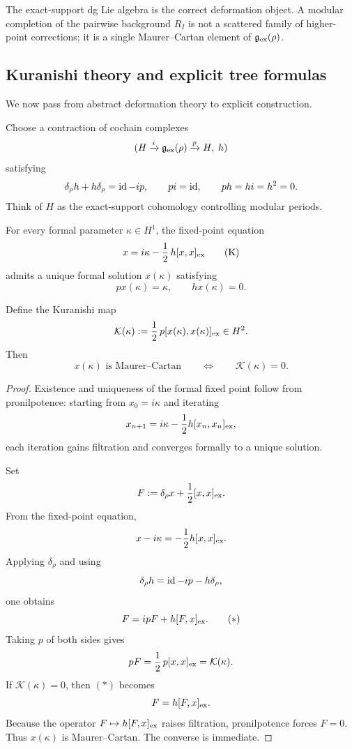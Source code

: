 \begin{remark}[Interpretation]
The exact-support dg Lie algebra is the correct deformation object. A modular completion of the
pairwise background $R_I$ is not a scattered family of higher-point corrections; it is a single Maurer--Cartan
element of $\mathfrak g_{\mathrm{ex}}(\rho)$.
\end{remark}

\subsection{Kuranishi theory and explicit tree formulas}

We now pass from abstract deformation theory to explicit construction.

Choose a contraction of cochain complexes
\[
(H \xrightarrow{i} \mathfrak g_{\mathrm{ex}}(\rho)\xrightarrow{p} H,\; h)
\]
satisfying
\[
\delta_\rho h+h\delta_\rho=\operatorname{id}-ip,
\qquad
pi=\operatorname{id},
\qquad
ph=hi=h^2=0.
\]
Think of $H$ as the exact-support cohomology controlling modular periods.

\begin{theorem}
\label{thm:kuranishi-theorem-for-ordered-modular-completions}
For every formal parameter $\kappa\in H^1$, the fixed-point equation
\[
x
=
i\kappa-\frac12\,h[x,x]_{\mathrm{ex}}
\tag{$\mathrm K$}
\]
admits a unique formal solution $x(\kappa)$ satisfying
\[
px(\kappa)=\kappa,
\qquad
hx(\kappa)=0.
\]

Define the Kuranishi map
\[
\mathcal K(\kappa):=\frac12\,p[x(\kappa),x(\kappa)]_{\mathrm{ex}}\in H^2.
\]
Then
\[
x(\kappa)\text{ is Maurer--Cartan}
\qquad\Longleftrightarrow\qquad
\mathcal K(\kappa)=0.
\]
\end{theorem}

\begin{proof}
Existence and uniqueness of the formal fixed point follow from pronilpotence:
starting from $x_0=i\kappa$ and iterating
\[
x_{n+1}=i\kappa-\frac12 h[x_n,x_n]_{\mathrm{ex}},
\]
each iteration gains filtration and converges formally to a unique solution.

Set
\[
F:=\delta_\rho x+\frac12[x,x]_{\mathrm{ex}}.
\]
From the fixed-point equation,
\[
x-i\kappa=-\frac12 h[x,x]_{\mathrm{ex}}.
\]
Applying $\delta_\rho$ and using
\[
\delta_\rho h=\operatorname{id}-ip-h\delta_\rho,
\]
one obtains
\[
F=ipF+h[F,x]_{\mathrm{ex}}.
\tag{$*$}
\]
Taking $p$ of both sides gives
\[
pF=\frac12\,p[x,x]_{\mathrm{ex}}=\mathcal K(\kappa).
\]
If $\mathcal K(\kappa)=0$, then $(*)$ becomes
\[
F=h[F,x]_{\mathrm{ex}}.
\]
Because the operator $F\mapsto h[F,x]_{\mathrm{ex}}$ raises filtration, pronilpotence forces $F=0$.
Thus $x(\kappa)$ is Maurer--Cartan. The converse is immediate.
\end{proof}

